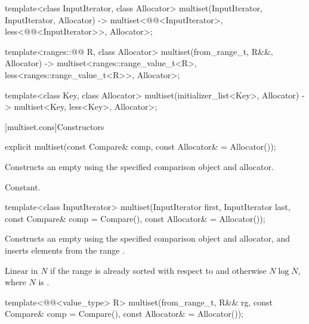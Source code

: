 \begin{codeblock}
{  template<class InputIterator, class Allocator>
    multiset(InputIterator, InputIterator, Allocator)
      -> multiset<@@<InputIterator>,
                  less<@@<InputIterator>>, Allocator>;

  template<ranges::@@ R, class Allocator>
    multiset(from_range_t, R&&, Allocator)
      -> multiset<ranges::range_value_t<R>, less<ranges::range_value_t<R>>, Allocator>;

  template<class Key, class Allocator>
    multiset(initializer_list<Key>, Allocator) -> multiset<Key, less<Key>, Allocator>;
}
\end{codeblock}%
%

[multiset.cons]{Constructors}

%
\begin{itemdecl}
explicit multiset(const Compare& comp, const Allocator& = Allocator());
\end{itemdecl}

\begin{itemdescr}
\pnum
\effects
Constructs an empty  using the specified comparison object and allocator.

\pnum
\complexity
Constant.
\end{itemdescr}

%
\begin{itemdecl}
template<class InputIterator>
  multiset(InputIterator first, InputIterator last,
           const Compare& comp = Compare(), const Allocator& = Allocator());
\end{itemdecl}

\begin{itemdescr}
\pnum
\effects
Constructs an empty
using the specified comparison object and allocator,
and inserts elements from the range
.

\pnum
\complexity
Linear in $N$
if the range
is already sorted with respect to  and otherwise $N \log N$,
where $N$ is
.
\end{itemdescr}

%
\begin{itemdecl}
template<@@<value_type> R>
  multiset(from_range_t, R&& rg, const Compare& comp = Compare(), const Allocator& = Allocator());
\end{itemdecl}


